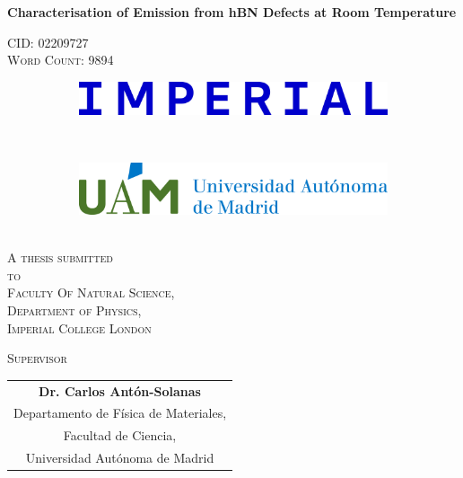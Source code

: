 \begin{center}

{\Huge \textbf{Characterisation of Emission from hBN Defects at Room Temperature} \\[\stretch{2}]}


\textsc{CID: 02209727 \\ Word Count: 9894}\\[\stretch{2}]

\begin{figure}[hb!t]
     \centering
     \begin{subfigure}[b]{0.5\textwidth}
         \centering
         \includegraphics[width=\textwidth]{Title/ICL_Logo.jpg}
     \end{subfigure}
     ~\\[1 cm]
     \begin{subfigure}[b]{0.5\textwidth}
         \centering
         \includegraphics[width=\textwidth]{Title/UAM_Logo.jpg}
     \end{subfigure}
     \hfill
\end{figure}

~\\[1cm]

\textsc{A thesis submitted \\[1ex]
to \\[1ex]
Faculty Of Natural Science,\\
Department of Physics, \\
Imperial College London\\[\stretch{3}]}

\textsc{Supervisor}\\[2ex]

\begin{tabular}[t]{@{}c@{}}
\bfseries Dr. Carlos Antón-Solanas \\
Departamento de Física de Materiales,\\
Facultad de Ciencia, \\
Universidad Autónoma de Madrid
\end{tabular}\hfil


\end{center}

\newpage




